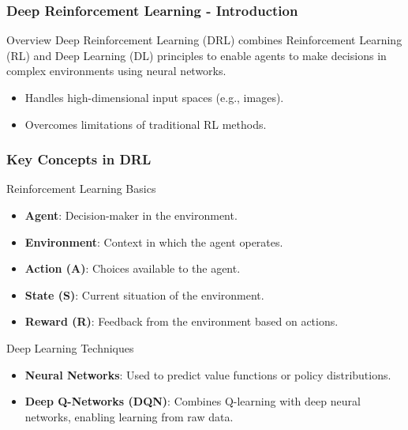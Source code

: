 \documentclass[aspectratio=169]{beamer}
\begin{document}
\begin{frame}[fragile]
    \frametitle{Deep Reinforcement Learning - Introduction}
    \begin{block}{Overview}
        Deep Reinforcement Learning (DRL) combines Reinforcement Learning (RL) and Deep Learning (DL) principles to enable agents to make decisions in complex environments using neural networks. 
    \end{block}
    
    \begin{itemize}
        \item Handles high-dimensional input spaces (e.g., images).
        \item Overcomes limitations of traditional RL methods.
    \end{itemize}
\end{frame}

\begin{frame}[fragile]
    \frametitle{Key Concepts in DRL}
    \begin{block}{Reinforcement Learning Basics}
        \begin{itemize}
            \item \textbf{Agent}: Decision-maker in the environment.
            \item \textbf{Environment}: Context in which the agent operates.
            \item \textbf{Action (A)}: Choices available to the agent.
            \item \textbf{State (S)}: Current situation of the environment.
            \item \textbf{Reward (R)}: Feedback from the environment based on actions.
        \end{itemize}
    \end{block}

    \begin{block}{Deep Learning Techniques}
        \begin{itemize}
            \item \textbf{Neural Networks}: Used to predict value functions or policy distributions.
            \item \textbf{Deep Q-Networks (DQN)}: Combines Q-learning with deep neural networks, enabling learning from raw data.
        \end{itemize}
    \end{block}
\end{frame}
\end{document}
